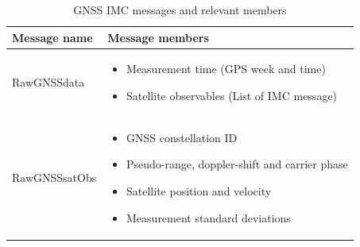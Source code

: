     \begin{table}[!htbp]
    \centering
    \begin{tabularx}{\textwidth}{ |l|X| }\hline
        \textbf{Message name}   & \textbf{Message members}  \\\hline
        RawGNSSdata & 
        \begin{minipage}[t]{0.7\textwidth}
            \begin{itemize}
                \item Measurement time (GPS week and time)
                \item Satellite observables (List of IMC message)
            \end{itemize}
        \end{minipage}\\\hline
        RawGNSSsatObs &
        \begin{minipage}[t]{0.7\textwidth}
            \begin{itemize}
                \item GNSS constellation ID
                \item Pseudo-range, doppler-shift and carrier phase
                \item Satellite position and velocity
                \item Measurement standard deviations
            \end{itemize}
        \end{minipage}\\\hline
    \end{tabularx}
    \caption{GNSS IMC messages and relevant members}
    \label{tab:imc-gnss}
    \end{table}
    
